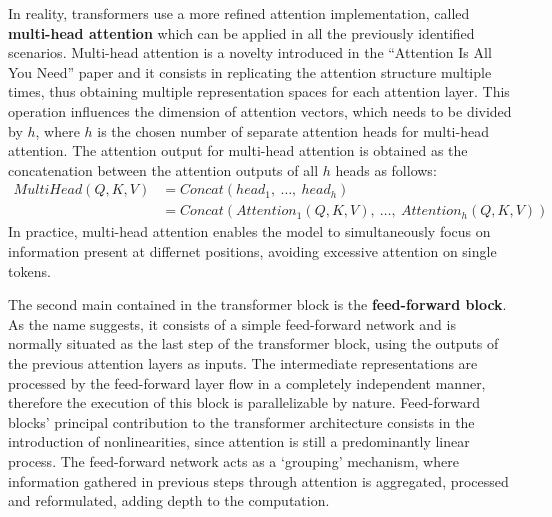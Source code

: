 In reality, transformers use a more refined attention implementation, called \textbf{multi-head attention} which can be applied in all the previously identified scenarios.
Multi-head attention is a novelty introduced in the ``Attention Is All You Need'' \cite{vaswani2017} paper and it consists in replicating the attention structure multiple times, thus obtaining multiple representation spaces for each attention layer.
This operation influences the dimension of attention vectors, which needs to be divided by $h$, where $h$ is the chosen number of separate attention heads for multi-head attention.
The attention output for multi-head attention is obtained as the concatenation between the attention outputs of all $h$ heads as follows:
\begin{equation}
    \begin{aligned}
    MultiHead(Q,K,V)    &= Concat(head_1,\ \ldots,\ head_h) \\
                        &= Concat(Attention_1(Q,K,V),\ \ldots,\ Attention_h(Q,K,V))
    \end{aligned}
\end{equation}
In practice, multi-head attention enables the model to simultaneously focus on information present at differnet positions, avoiding excessive attention on single tokens.


The second main  contained in the transformer block is the \textbf{feed-forward block}.
As the name suggests, it consists of a simple feed-forward network and is normally situated as the last step of the transformer block, using the outputs of the previous attention layers as inputs.
The intermediate representations are processed by the feed-forward layer flow in a completely independent manner, therefore the execution of this block is parallelizable by nature.
Feed-forward blocks' principal contribution to the transformer architecture consists in the introduction of nonlinearities, since attention is still a predominantly linear process.
The feed-forward network acts as a `grouping' mechanism, where information gathered in previous steps through attention is aggregated, processed and reformulated, adding depth to the computation.


